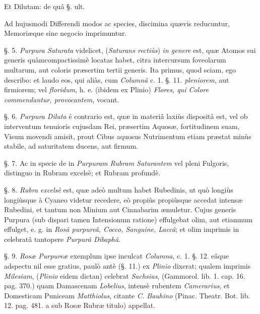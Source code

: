 \documentclass[a4paper, 11pt, oneside, polutonikogreek, german]{article}
\begin{document}
Et Dilutam: de quâ §. ult.

Ad hujusmodi Differendi modos ac species, discimina quævis reducuntur, Memoriæque sine negocio imprimuntur.

§. 5. \emph{Purpura Saturata} videlicet, (\emph{Saturans rectiùs}) \emph{in genere} est, quæ Atomos sui generis quàmcompactissimè locatas habet, citra intercursum foveolarum multarum, aut coloris præsertim tertii generis. Ita primus, quod sciam, ego describo: et laudo eos, qui aliàs, cum \emph{Columnâ} c. 1. §. 11. \emph{pleniorem}, aut firmiorem; vel \emph{floridum}, h. e. (ibidem ex Plinio) \emph{Flores, qui Colore commendantur, provocantem}, vocant.

§. 6. \emph{Purpura Diluta} é contrario est, quæ in materiâ laxiùs dispositâ est, vel ob interventum tenuioris cujusdam Rei, præsertim Aquosæ, fortitudinem suam, Visum movendi amisit, prout Cibus aquosus Nutrimentum etiam præstat minùs stabile, ad saturitatem ducens, aut firmum.

§. 7. Ac in specie de in \emph{Purpuram Rubram Saturantem} vel pleni Fulgoris, distinguo in Rubram excelsè; et Rubram profundè.

§. 8. \emph{Rubra excelsè} est, quæ adeò multum habet Rubedinis, ut quò longiùs longiùsque à Cyaneo videtur recedere, eò propiùs propiùsque accedat intensæ Rubedini, et tantum non Minium aut Cinnabarim æmuletur. Cujus generis Purpura (sub dispari tamen Intensionum ratione) effulgebat olim, aut etiamnum effulget, e. g. in \emph{Rosâ purpureâ, Cocco, Sanguine, Laccâ}; et olim imprimis in celebratâ tantopere \emph{Purpurâ Dibaphâ}.

§. 9. \emph{Rosæ Purpureæ} exemplum ipse inculcat \emph{Columna}, c. 1. §. 12. eâque adspectu nil esse gratius, paulò antè (§. 11.) ex \emph{Plinio} dixerat; qualem imprimis \emph{Milesiam}, (\emph{Plinio} eidem dictan) celebrat \emph{Sachsius}, (Gammorol. lib. 1. cap. 16. pag. 370.) quam Damascenam \emph{Lobelius}, intensè rubentem \emph{Camerarius}, et Domesticam Puniceam \emph{Matthiolus}, citante \emph{C. Bauhino} (Pinac. Theatr. Bot. lib. 12. pag. 481. a sub Rosæ Rubræ titulo) appellat.
\end{document}
